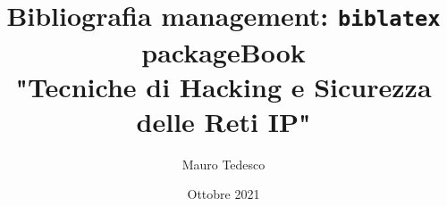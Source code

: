 \documentclass[a4paper,12pt]{book}
\title{Bibliografia management: \texttt{biblatex} package}
\begin{document}
	

\renewcommand{\chaptermark}[1]{ \markboth{#1}{} }
\renewcommand{\sectionmark}[1]{ \markright{#1}{} }

\renewcommand{\headrulewidth}{0.5pt}
\renewcommand{\footrulewidth}{1pt}




\author{Mauro Tedesco}
\title{Book \\
	"Tecniche di Hacking e Sicurezza delle
	Reti IP"}
\date{Ottobre 2021}



\frontmatter
\maketitle
\tableofcontents

\mainmatter




















\backmatter


\printindex

\printbibliography
\end{document}
